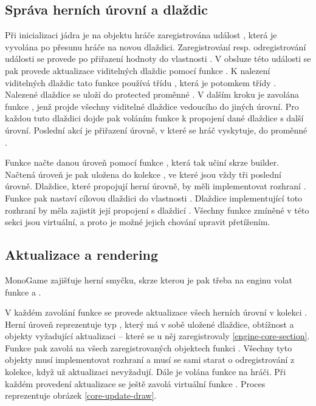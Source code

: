 \subsection{Správa herních úrovní a dlaždic}\label{engine-level-management}
Při inicializaci jádra je na objektu hráče zaregistrována událost , která
je vyvolána po přesunu hráče na novou dlaždici. Zaregistrování resp. odregistrování události se provede po
přiřazení hodnoty do vlastnosti . V obsluze této události se pak provede aktualizace
viditelných dlaždic pomocí funkce  . K nalezení viditelných dlaždic tato funkce používá
třídu , která je potomkem třídy . Nalezené dlaždice se
uloží do protected proměnné . V dalším kroku je zavolána funkce 
, jenž projde všechny viditelné dlaždice vedoucího do jiných úrovní. Pro
každou tuto dlaždici dojde pak voláním funkce  k propojení dané dlaždice s další
úrovní. Poslední akcí je přiřazení úrovně, v které se hráč vyskytuje, do proměnné .

Funkce  načte danou úroveň pomocí funkce , která tak učiní skrze builder.
Načtená úroveň je pak uložena do kolekce , ve které jsou vždy tři poslední úrovně.
Dlaždice, které propojují herní úrovně, by měli implementovat rozhraní .
Funkce  pak nastaví cílovou dlaždici do vlastnosti .
Dlaždice implementující toto rozhraní by měla zajistit její propojení s dlaždicí .
Všechny funkce zmíněné v této sekci jsou virtuální, a proto je možné jejich chování upravit přetížením.


\subsection{Aktualizace a rendering}
MonoGame zajišťuje herní smyčku, skrze kterou je pak třeba na enginu volat funkce  a .

V každém zavolání funkce  se provede aktualizace všech herních úrovní v kolekci .
Herní úroveň reprezentuje typ , který má v sobě uložené dlaždice, obtížnost a objekty vyžadující
aktualizaci -- které se u něj zaregistrovaly \vref{engine-core-section}. Funkce  pak 
zavolá na všech zaregistrovaných objektech  funkci . Všechny tyto objekty musí implementovat
rozhraní  a musí se sami starat o odregistrování z kolekce, když už aktualizaci nevyžadují. Dále je volána 
funkce  na hráči. Při každém provedení aktualizace se ještě zavolá virtuální funkce 
. Proces reprezentuje obrázek \ref{core-update-draw}.

